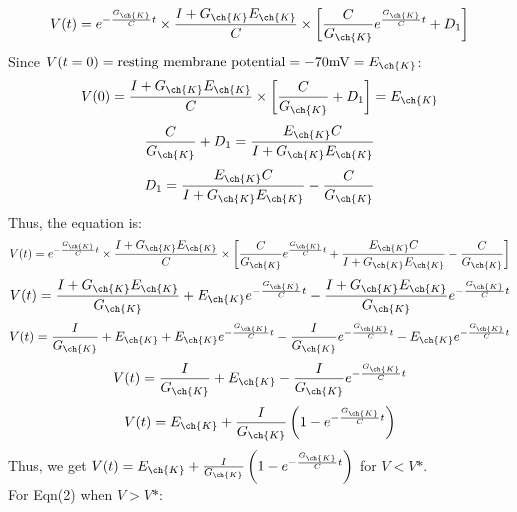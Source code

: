 \documentclass[11pt]{article}
\begin{document}
\begin{enumerate}[label=\arabic*.]
\begin{enumerate}[label=(\alph*)]
\begin{align*}
\end{align*}
\begin{align*}
V(t) = e^{-\frac{G_{\ch{K}}} {C} t} \times \frac{I + G_{\ch{K}} E_{\ch{K}}} {C} \times \left[\frac{C} {G_{\ch{K}}} e^{\frac{G_{\ch{K}}} {C} t} + D_1\right]
\end{align*}
Since $V(t = 0) = \text{resting membrane potential} = -70 \text{mV} = E_{\ch{K}}$:
\begin{align*}
V(0) = \frac{I + G_{\ch{K}} E_{\ch{K}}} {C} \times \left[\frac{C} {G_{\ch{K}}} + D_1\right] = E_{\ch{K}}
\end{align*}
\begin{align*}
\frac{C} {G_{\ch{K}}} + D_1 =  \frac{E_{\ch{K}}C} {I + G_{\ch{K}} E_{\ch{K}}}
\end{align*}
\begin{align*}
D_1 =  \frac{E_{\ch{K}}C} {I + G_{\ch{K}} E_{\ch{K}}} - \frac{C} {G_{\ch{K}}}
\end{align*}
Thus, the equation is:
\begin{align*}
V(t) = e^{-\frac{G_{\ch{K}}} {C} t} \times \frac{I + G_{\ch{K}} E_{\ch{K}}} {C} \times \left[\frac{C} {G_{\ch{K}}} e^{\frac{G_{\ch{K}}} {C} t} + \frac{E_{\ch{K}}C} {I + G_{\ch{K}} E_{\ch{K}}} - \frac{C} {G_{\ch{K}}}\right]
\end{align*}
\begin{align*}
V(t) = \frac{I + G_{\ch{K}} E_{\ch{K}}} {G_{\ch{K}}} + E_{\ch{K}} e^{-\frac{G_{\ch{K}}} {C} t} - \frac{I + G_{\ch{K}} E_{\ch{K}}} {G_{\ch{K}}} e^{-\frac{G_{\ch{K}}} {C} t}
\end{align*}
\begin{align*}
V(t) = \frac{I} {G_{\ch{K}}} + E_{\ch{K}} + E_{\ch{K}} e^{-\frac{G_{\ch{K}}} {C} t} - \frac{I} {G_{\ch{K}}} e^{-\frac{G_{\ch{K}}} {C} t} - E_{\ch{K}} e^{-\frac{G_{\ch{K}}} {C} t}
\end{align*}
\begin{align*}
V(t) = \frac{I} {G_{\ch{K}}} + E_{\ch{K}} - \frac{I} {G_{\ch{K}}} e^{-\frac{G_{\ch{K}}} {C} t}
\end{align*}
\begin{align*}
V(t) = E_{\ch{K}} + \frac{I} {G_{\ch{K}}} \left(1 - e^{-\frac{G_{\ch{K}}} {C} t}\right)
\end{align*}
Thus, we get $V(t) = E_{\ch{K}} + \frac{I} {G_{\ch{K}}} \left(1 - e^{-\frac{G_{\ch{K}}} {C} t}\right)$ for $V < V\text{*}$.
\vspace*{1\baselineskip}
\\
For Eqn(2) when $V > V\text{*}$:
\begin{align*}

\end{align*}
\end{enumerate}
\end{enumerate}
\end{document}
